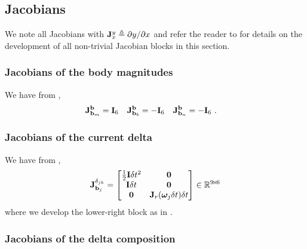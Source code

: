 \subsection{Jacobians}

\newcommand{\jac}[2]{{\bfJ^{#1}_{#2}}}

We note all Jacobians with $\jac{y}{x}\te\dparil{y}{x}$ and refer the reader to  for details on the development of all non-trivial Jacobian blocks in this section.



\subsubsection{Jacobians of the body magnitudes}

We have from ,
%
\begin{align}\label{equ:jac_body}
\jac{\bfb}{\bfb_m}&=\bfI_6 & \jac{\bfb}{\bfb_b}&=-\bfI_6 & \jac{\bfb}{\bfb_n}&=-\bfI_6
~.
\end{align}

\subsubsection{Jacobians of the current delta}
\label{sec:jac_data}

We have from ,
%
\begin{align}\label{equ:jac_current_delta}
\jac{\delta_{jk}}{\bfb_j} =
\begin{bmatrix}
\frac12\bfI\dt^2 	& \bf0 \\
\bfI\dt 			& \bf0 \\
\bf0 	          & \bfJ_r(\bw_j\dt)\dt
\end{bmatrix} 
\in \bbR^{9\tcross6}
\end{align}
%
where we develop the lower-right block as in .





\subsubsection{Jacobians of the delta composition}

